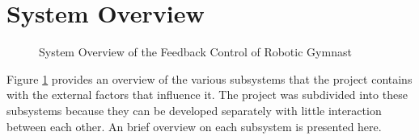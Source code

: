 \begin{comment}
\begin{figure}
	\centering
	
	\caption{State Space Representation with Feedback Gain}
	\label{fig:linearSys}
\end{figure}

\begin{equation} \label{eq:closedSysFeedback}
\centering
\text{det}[s\boldsymbol{I}-(\boldsymbol{A}-\boldsymbol{B}\boldsymbol{K})] = 0
\end{equation}

The classical approach to controlling a system is by implementing a controller which reacts on the error of the desired state and the current state. These controllers are more commonly known as PID-controllers where the controller equation is shown in (\ref{eq:PID}).

\begin{equation} \label{eq:PID}
\centering
u(t) = K[ e(t)+K_{I}\int_{0}^{t}e(\tau)d\tau +K_{D}\frac{de(t)}{dt}]
\end{equation}

Each term represent an effect it has on the system response when the PID-controller is implemented shown in Figure \ref{fig:PIDcontroller}. If the system or plant is assumed to be a second-order differential equation represented by:
\begin{equation} \label{eq:PID_system}
\centering
\dddot{q}+(2\zeta\omega_{n}+K_{D})\ddot{q}+(\omega_{n}^2+K_{P})\dot{q}+K_{I} = 0
\end{equation}

From equation (7) it is visible that by tuning the PID constants the response of the system can controlled.
\end{comment}


\section{System Overview}
\label{sec:system_overview}
\begin{figure}[h]
	\centering
	
	\caption{System Overview of the Feedback Control of Robotic Gymnast}
	\label{fig:system_overview}
\end{figure}


Figure \ref{fig:system_overview} provides an overview of the various subsystems that the project contains with the external factors that influence it. The project was subdivided into these subsystems because they can be developed separately with little interaction between each other. An brief overview on each subsystem is presented here.\\

